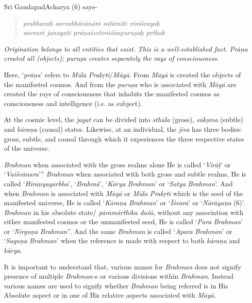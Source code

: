 Sri GaudapadAcharya (6) says-

\begin{verse}
\emph{prabhavaḥ sarvabhāvānāṁ satāmiti viniścayaḥ }\\
\emph{sarvaṁ janayati prāṇaścetoṁśūnpuruṣaḥ pṛthak }
\end{verse}

\emph{Origination belongs to all entities that exist. This is a well-established fact. Prāṇa created all (objects); puruṣa creates separately the rays of consciousness.}

Here, `\emph{prāṇa}' refers to \emph{Mūla} \emph{Prakṛti}/\emph{Māyā}. From \emph{Māyā} is created the objects of the manifested cosmos. And from the \emph{puruṣa} who is associated with \emph{Māyā} are created the rays of consciousness that inhabits the manifested cosmos as consciousness and intelligence (i.e. as subject).

At the cosmic level, the \emph{jagat} can be divided into \emph{sthūla} (gross), \emph{sūkṣma} (subtle) and \emph{kāraṇa} (causal) states. Likewise, at an individual, the \emph{jīva} has three bodies: gross, subtle, and causal through which it experiences the three respective states of the universe.

\emph{Brahman} when associated with the gross realms alone He is called `\emph{Virāṭ}' or `\emph{Vaiśvānara}''' \emph{Brahman} when associated with both gross and subtle realms, He is called `\emph{Hiraṇyagarbha}', `\emph{Brahmā}', `\emph{Kārya} \emph{Brahman}' or `\emph{Satya} \emph{Brahman}'. And when \emph{Brahman} is associated with \emph{Māyā} or \emph{Mūla} \emph{Prakṛti} which is the seed of the manifested universe, He is called `\emph{Kāraṇa} \emph{Brahman}' or `\emph{Īśvara}' or `\emph{Nārāyaṇa} (6)'. \emph{Brahman} in his absolute state/ \emph{pāramārthika daśā}, without any association with either manifested cosmos or the unmanifested seed, He is called `\emph{Para} \emph{Brahman}' or `\emph{Nirguṇa} \emph{Brahman}''. And the same \emph{Brahman} is called `\emph{Apara} \emph{Brahman}' or `\emph{Saguṇa} \emph{Brahman}' when the reference is made with respect to both \emph{kāraṇa} and \emph{kārya}.

It is important to understand that, various names for \emph{Brahman} does not signify presence of multiple \emph{Brahman-}s or various divisions within \emph{Brahman}. Instead various names are used to signify whether \emph{Brahman} being referred is in His Absolute aspect or in one of His relative aspects associated with \emph{Māyā}.

